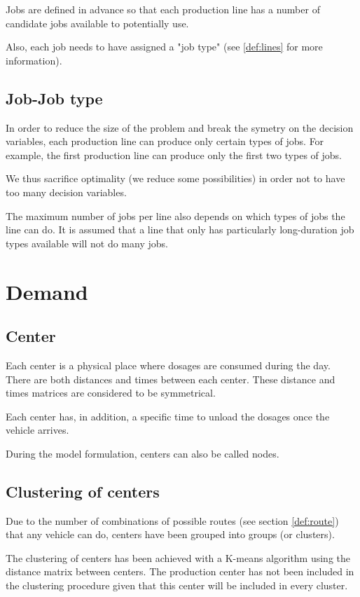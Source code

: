 Jobs are defined in advance so that each production line has a number of candidate jobs available to potentially use.

Also, each job needs to have assigned a "job type" (see \ref{def:lines} for more information).

\subsection{Job-Job type}

In order to reduce the size of the problem and break the symetry on the decision variables, each production line can produce only certain types of jobs. For example, the first production line can produce only the first two types of jobs.

We thus sacrifice optimality (we reduce some possibilities) in order not to have too many decision variables.

The maximum number of jobs per line also depends on which types of jobs the line can do. It is assumed that a line that only has particularly long-duration job types available will not do many jobs.

\section{Demand}

\subsection{Center}

Each center is a physical place where dosages are consumed during the day. There are both distances and times between each center. These distance and times matrices are considered to be symmetrical.

Each center has, in addition, a specific time to unload the dosages once the vehicle arrives.

During the model formulation, centers can also be called nodes.

\subsection{Clustering of centers}
\label{def:cluster}

Due to the number of combinations of possible routes (see section \ref{def:route}) that any vehicle can do, centers have been grouped into groups (or clusters).

The clustering of centers has been achieved with a K-means algorithm using the distance matrix between centers. The production center has not been included in the clustering procedure given that this center will be included in every cluster.

